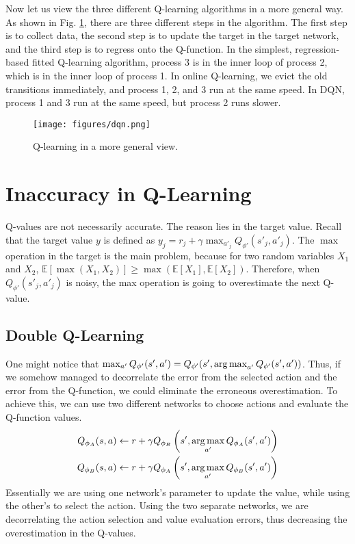 Now let us view the three different Q-learning algorithms in a more general way. As shown in Fig. \ref{fig:dqn}, there are three different steps in the algorithm. The first step is to collect data, the second step is to update the target in the target network, and the third step is to regress onto the Q-function. In the simplest, regression-based fitted Q-learning algorithm, process 3 is in the inner loop of process 2, which is in the inner loop of process 1. In online Q-learning, we evict the old transitions immediately, and process 1, 2, and 3 run at the same speed. In DQN, process 1 and 3 run at the same speed, but process 2 runs slower.
\begin{figure}
    \centering
    \texttt{[image: figures/dqn.png]}
    \caption{Q-learning in a more general view.}
    \label{fig:dqn}
\end{figure}

\section{Inaccuracy in Q-Learning}
Q-values are not necessarily accurate. The reason lies in the target value. Recall that the target value $y$ is defined as $y_j = r_j + \gamma \max_{a'_j}Q_{\phi'}(s'_j,a'_j)$. The $\max$ operation in the target is the main problem, because for two random variables $X_1$ and $X_2$, $\mathbb{E}[\max(X_1,X_2)] \geq \max(\mathbb{E}[X_1],\mathbb{E}[X_2])$. Therefore, when $Q_{\phi'}(s'_j,a'_j)$ is noisy, the max operation is going to overestimate the next Q-value.

\subsection{Double Q-Learning}
One might notice that $\max_{a'}Q_{\phi'}(s',a') = Q_{\phi'}(s',\operatorname*{arg\,max}_{a'}Q_{\phi'}(s',a'))$. Thus, if we somehow managed to decorrelate the error from the selected action and the error from the Q-function, we could eliminate the erroneous overestimation. To achieve this, we can use two different networks to choose actions and evaluate the Q-function values. 
\begin{align*}
    Q_{\phi_A}(s,a) &\leftarrow r + \gamma Q_{\phi_B}\left(s',\operatorname*{arg\,max}_{a'}Q_{\phi_A}(s',a')\right)\\
    Q_{\phi_B}(s,a) &\leftarrow r + \gamma Q_{\phi_A}\left(s',\operatorname*{arg\,max}_{a'}Q_{\phi_B}(s',a')\right)
\end{align*}
Essentially we are using one network's parameter to update the value, while using the other's to select the action. Using the two separate networks, we are decorrelating the action selection and value evaluation errors, thus decreasing the overestimation in the Q-values.

